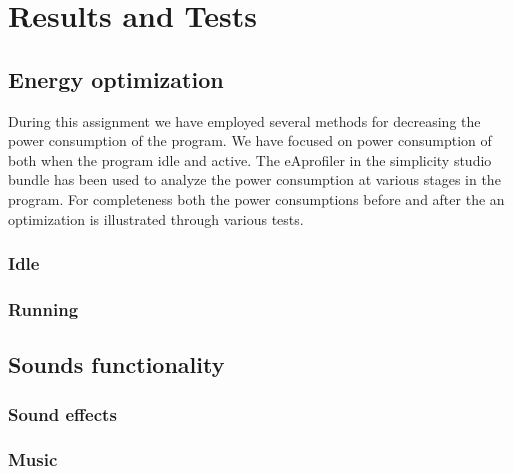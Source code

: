\section{Results and Tests}

\subsection{Energy optimization}
During this assignment we have employed several methods for decreasing the power consumption of the program. We have focused on power consumption of both when the program idle and active. The eAprofiler in the simplicity studio bundle has been used to analyze the power consumption at various stages in the program. For completeness both the power consumptions before and after the an optimization is illustrated through various tests.


\subsubsection{Idle}



\subsubsection{Running}


\subsection{Sounds functionality}


\subsubsection{Sound effects}


\subsubsection{Music}



